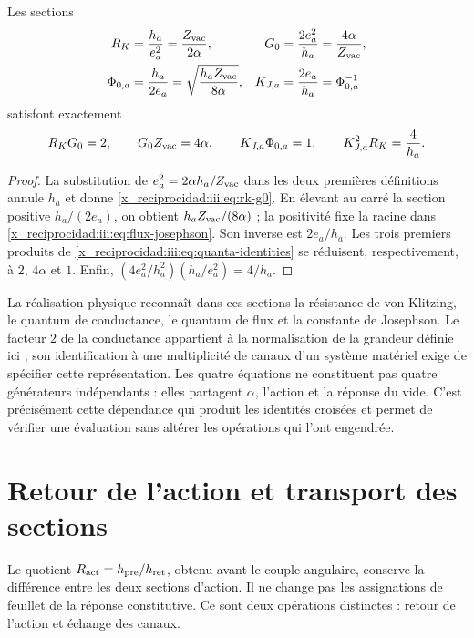 \begin{theorem}
Les sections
\begin{align}
 R_K&=\frac{h_a}{e_a^2}=\frac{Z_{\rm vac}}{2\alpha},
 &G_0&=\frac{2e_a^2}{h_a}=\frac{4\alpha}{Z_{\rm vac}},
 \label{x_reciprocidad:iii:eq:rk-g0}\\
 \Phi_{0,a}&=\frac{h_a}{2e_a}
 =\sqrt{\frac{h_aZ_{\rm vac}}{8\alpha}},
 &K_{J,a}&=\frac{2e_a}{h_a}=\Phi_{0,a}^{-1}
 \label{x_reciprocidad:iii:eq:flux-josephson}
\end{align}
satisfont exactement
\begin{equation}
 R_KG_0=2,\qquad G_0Z_{\rm vac}=4\alpha,\qquad
 K_{J,a}\Phi_{0,a}=1,\qquad
 K_{J,a}^{2}R_K=\frac4{h_a}.
 \label{x_reciprocidad:iii:eq:quanta-identities}
\end{equation}
\end{theorem}
\begin{proof}
La substitution de $e_a^2=2\alpha h_a/Z_{\rm vac}$ dans les deux premières
définitions annule $h_a$ et donne \eqref{x_reciprocidad:iii:eq:rk-g0}. En élevant au
carré la section positive $h_a/(2e_a)$, on obtient
$h_aZ_{\rm vac}/(8\alpha)$ ; la positivité fixe la racine dans
\eqref{x_reciprocidad:iii:eq:flux-josephson}. Son inverse est $2e_a/h_a$.
Les trois premiers produits de \eqref{x_reciprocidad:iii:eq:quanta-identities} se
réduisent, respectivement, à $2$, $4\alpha$ et $1$. Enfin,
$(4e_a^2/h_a^2)(h_a/e_a^2)=4/h_a$.
\end{proof}

La réalisation physique reconnaît dans ces sections la résistance de von Klitzing, le quantum de conductance, le quantum de flux et la constante de Josephson. Le facteur $2$ de la conductance appartient à la normalisation de la grandeur définie ici ; son identification à une multiplicité de canaux d'un système matériel exige de spécifier cette représentation.
Les quatre équations ne constituent pas quatre générateurs indépendants : elles partagent $\alpha$, l'action et la réponse du vide. C'est précisément cette dépendance qui produit les identités croisées et permet de vérifier une évaluation sans altérer les opérations qui l'ont engendrée.

\section{Retour de l’action et transport des sections}

Le quotient $R_{\rm act}=h_{\rm pre}/h_{\rm ret}$, obtenu avant le
couple angulaire, conserve la différence entre les deux sections d’action.
Il ne change pas les assignations de feuillet de la réponse constitutive. Ce sont deux
opérations distinctes : retour de l’action et échange des canaux.

